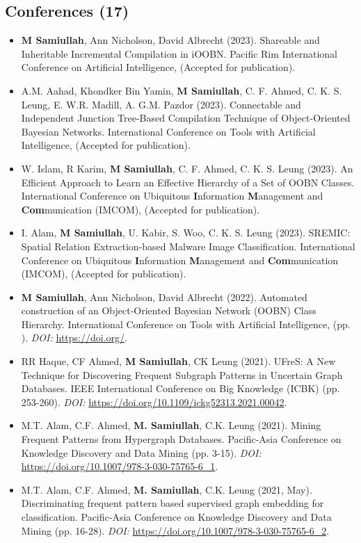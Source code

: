 \documentclass{my_cv}
\begin{document}
\subsection{Conferences (17)}
\begin{itemize}[noitemsep]
    \item \textbf{M Samiullah}, Ann Nicholson, David Albrecht (2023). Shareable and Inheritable Incremental Compilation in iOOBN. Pacific Rim International Conference on Artificial Intelligence, (Accepted for publication).
    \item A.M. Aahad, Khondker Bin Yamin, \textbf{M Samiullah}, C. F. Ahmed, C. K. S. Leung, E. W.R. Madill, A. G.M. Pazdor (2023). Connectable and Independent Junction Tree-Based Compilation Technique of Object-Oriented Bayesian Networks. International Conference on Tools with Artificial Intelligence, (Accepted for publication).
    \item W. Islam, R Karim, \textbf{M Samiullah}, C. F. Ahmed, C. K. S. Leung (2023). An Efficient Approach to Learn an Effective Hierarchy of a Set of OOBN Classes. International Conference on Ubiquitous \textbf{I}nformation \textbf{M}anagement and \textbf{Com}munication (IMCOM), (Accepted for publication).
    \item I. Alam, \textbf{M Samiullah}, U. Kabir, S. Woo, C. K. S. Leung (2023). SREMIC: Spatial Relation Extraction-based Malware Image Classification. International Conference on Ubiquitous \textbf{I}nformation \textbf{M}anagement and \textbf{Com}munication (IMCOM), (Accepted for publication).
    \item \textbf{M Samiullah}, Ann Nicholson, David Albrecht (2022). Automated construction of an Object-Oriented Bayesian Network (OOBN) Class Hierarchy. International Conference on Tools with Artificial Intelligence, (pp. ). {\em DOI:} \url{https://doi.org/}.
    \item RR Haque, CF Ahmed, \textbf{M Samiullah}, CK Leung (2021). UFreS: A New Technique for Discovering Frequent Subgraph Patterns in Uncertain Graph Databases. IEEE International Conference on Big Knowledge (ICBK) (pp. 253-260). {\em DOI:} \url{https://doi.org/10.1109/ickg52313.2021.00042}.
    \item M.T. Alam, C.F. Ahmed, \textbf{M. Samiullah}, C.K. Leung (2021). Mining Frequent Patterns from Hypergraph Databases. Pacific-Asia Conference on Knowledge Discovery and Data Mining (pp. 3-15). {\em DOI:} \url{https://doi.org/10.1007/978-3-030-75765-6_1}.
    \item M.T. Alam, C.F. Ahmed, \textbf{M. Samiullah}, C.K. Leung (2021, May). Discriminating frequent pattern based supervised graph embedding for classification. Pacific-Asia Conference on Knowledge Discovery and Data Mining (pp. 16-28). {\em DOI:} \url{https://doi.org/10.1007/978-3-030-75765-6_2}.

\end{itemize}
\end{document}

